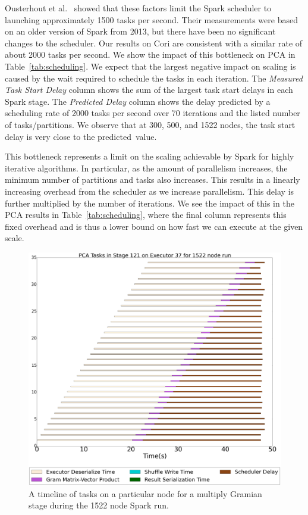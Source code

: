 Ousterhout et al.~\cite{Ousterhout13Sparrow} showed that these factors limit the Spark scheduler to launching approximately 1500 tasks per second.  Their measurements were based on an older version of Spark from 2013, but there have been no significant changes to the scheduler. Our results on Cori are consistent with a similar rate of about 2000 tasks per second.  We show the impact of this bottleneck on PCA in Table~\ref{tab:scheduling}.  
We expect that the largest negative impact on scaling is caused by the wait required to schedule the tasks in each iteration. The \emph{Measured Task Start Delay} column shows the sum of the largest task start delays in each Spark stage.  The \emph{Predicted Delay} column shows the delay predicted by a scheduling rate of 2000 tasks per second over 70 iterations and the listed number of tasks/partitions.  We observe that at 300, 500, and 1522 nodes, the task start delay is very close to the predicted~value.

This bottleneck represents a limit on the scaling achievable by Spark for highly iterative algorithms.  In particular, as the amount of parallelism increases, the minimum number of partitions and tasks also increases.  This results in a linearly increasing overhead from the scheduler as we increase parallelism.  This delay is further multiplied by the number of iterations.  We see the impact of this in the PCA results in Table~\ref{tab:scheduling}, where the final column represents this fixed overhead and is thus a lower bound on how fast we can execute at the given scale.  

\begin{figure}[tbhp]
\centering
\includegraphics[width=.6\textwidth]{fig/spark_pca_hero_timeline.png}
\caption{A timeline of tasks on a particular node for a multiply Gramian stage during the 1522 node Spark run. }
\label{fig:hero-timeline}
\end{figure}

